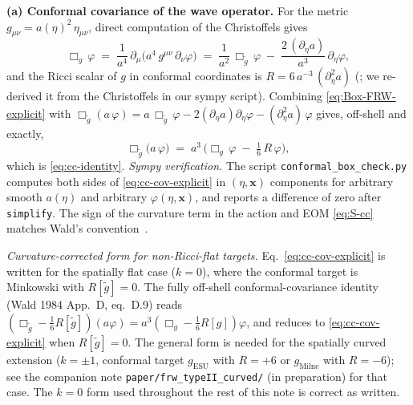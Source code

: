 \documentclass[11pt]{article}
\theoremstyle{definition}
\begin{document}
\smallskip

\noindent\textbf{(a) Conformal covariance of the wave operator.} For the metric $g_{\mu\nu} = a(\eta)^2\,\eta_{\mu\nu}$, direct computation of the Christoffels gives
\begin{equation}\label{eq:Box-FRW-explicit}
\Box_g\,\varphi \;=\; \frac{1}{a^4}\,\partial_\mu\big(a^4\,g^{\mu\nu}\,\partial_\nu \varphi\big)
\;=\; \frac{1}{a^2}\,\Box_{\tilde g}\,\varphi \;-\; \frac{2\,(\partial_\eta a)}{a^3}\,\partial_\eta \varphi,
\end{equation}
and the Ricci scalar of $g$ in conformal coordinates is $R = 6\,a^{-3}\,(\partial_\eta^2 a)$ (\cite[\S5.1]{Wald1994}; we re-derived it from the Christoffels in our sympy script). Combining \eqref{eq:Box-FRW-explicit} with $\Box_{\tilde g}(a\,\varphi) = a\,\Box_{\tilde g}\,\varphi - 2(\partial_\eta a)\partial_\eta\varphi - (\partial_\eta^2 a)\,\varphi$ gives, off-shell and exactly,
\begin{equation}\label{eq:cc-cov-explicit}
\Box_{\tilde g}\big(a\,\varphi\big) \;=\; a^3\,\Big(\Box_g\,\varphi \;-\; \tfrac{1}{6}\,R\,\varphi\Big),
\end{equation}
which is \eqref{eq:cc-identity}. \emph{Sympy verification.} The script \texttt{conformal\_box\_check.py} computes both sides of \eqref{eq:cc-cov-explicit} in $(\eta,\mathbf{x})$ components for arbitrary smooth $a(\eta)$ and arbitrary $\varphi(\eta,\mathbf{x})$, and reports a difference of zero after \texttt{simplify}. The sign of the curvature term in the action and EOM \eqref{eq:S-cc} matches Wald's convention~\cite[\S4.6]{Wald1994}.

\noindent\emph{Curvature-corrected form for non-Ricci-flat targets.} Eq.~\eqref{eq:cc-cov-explicit} is written for the spatially flat case ($k=0$), where the conformal target is Minkowski with $R[\tilde g]=0$. The fully off-shell conformal-covariance identity (Wald 1984 App.~D, eq.~D.9) reads $(\Box_{\tilde g} - \tfrac{1}{6}R[\tilde g])(a\varphi) = a^3(\Box_g - \tfrac{1}{6}R[g])\varphi$, and reduces to \eqref{eq:cc-cov-explicit} when $R[\tilde g]=0$. The general form is needed for the spatially curved extension ($k=\pm 1$, conformal target $g_\mathrm{ESU}$ with $R=+6$ or $g_\mathrm{Milne}$ with $R=-6$); see the companion note \texttt{paper/frw\_typeII\_curved/} (in preparation) for that case. The $k=0$ form used throughout the rest of this note is correct as written.

\smallskip
\end{document}
